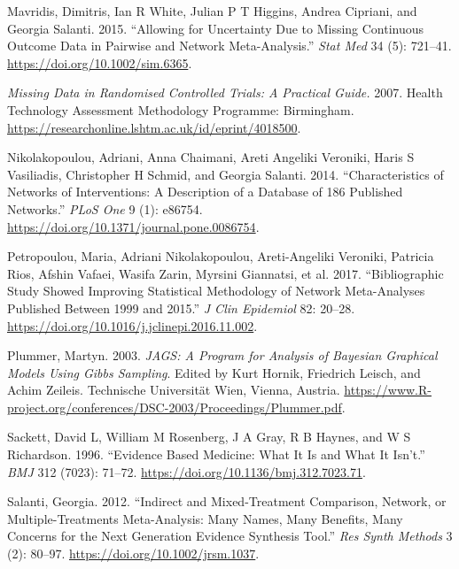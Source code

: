 \begin{CSLReferences}{1}{0}
\leavevmode{}%
Mavridis, Dimitris, Ian R White, Julian P T Higgins, Andrea Cipriani, and Georgia Salanti. 2015. {``Allowing for Uncertainty Due to Missing Continuous Outcome Data in Pairwise and Network Meta-Analysis.''} \emph{Stat Med} 34 (5): 721--41. \url{https://doi.org/10.1002/sim.6365}.

\leavevmode{}%
\emph{Missing Data in Randomised Controlled Trials: A Practical Guide.} 2007. Health Technology Assessment Methodology Programme: Birmingham. \url{https://researchonline.lshtm.ac.uk/id/eprint/4018500}.

\leavevmode{}%
Nikolakopoulou, Adriani, Anna Chaimani, Areti Angeliki Veroniki, Haris S Vasiliadis, Christopher H Schmid, and Georgia Salanti. 2014. {``Characteristics of Networks of Interventions: A Description of a Database of 186 Published Networks.''} \emph{PLoS One} 9 (1): e86754. \url{https://doi.org/10.1371/journal.pone.0086754}.

\leavevmode{}%
Petropoulou, Maria, Adriani Nikolakopoulou, Areti-Angeliki Veroniki, Patricia Rios, Afshin Vafaei, Wasifa Zarin, Myrsini Giannatsi, et al. 2017. {``Bibliographic Study Showed Improving Statistical Methodology of Network Meta-Analyses Published Between 1999 and 2015.''} \emph{J Clin Epidemiol} 82: 20--28. \url{https://doi.org/10.1016/j.jclinepi.2016.11.002}.

\leavevmode{}%
Plummer, Martyn. 2003. \emph{JAGS: A Program for Analysis of Bayesian Graphical Models Using Gibbs Sampling}. Edited by Kurt Hornik, Friedrich Leisch, and Achim Zeileis. Technische Universität Wien, Vienna, Austria. \url{https://www.R-project.org/conferences/DSC-2003/Proceedings/Plummer.pdf}.

\leavevmode{}%
Sackett, David L, William M Rosenberg, J A Gray, R B Haynes, and W S Richardson. 1996. {``Evidence Based Medicine: What It Is and What It Isn't.''} \emph{BMJ} 312 (7023): 71--72. \url{https://doi.org/10.1136/bmj.312.7023.71}.

\leavevmode{}%
Salanti, Georgia. 2012. {``Indirect and Mixed-Treatment Comparison, Network, or Multiple-Treatments Meta-Analysis: Many Names, Many Benefits, Many Concerns for the Next Generation Evidence Synthesis Tool.''} \emph{Res Synth Methods} 3 (2): 80--97. \url{https://doi.org/10.1002/jrsm.1037}.


\end{CSLReferences}
